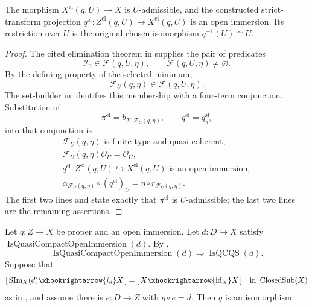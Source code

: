 \begin{lemma}
  \label{lemma:nagata-elimination-indeterminacy}
  \lean{}

  The morphism $X^{\mathrm{el}}(q,U)\to X$ is $U$-admissible, and the
  constructed strict-transform projection
  $q^{\mathrm{el}}\colon Z^{\mathrm{el}}(q,U)\to X^{\mathrm{el}}(q,U)$ is
  an open immersion.  Its restriction over $U$ is the original chosen
  isomorphism $q^{-1}(U)\cong U$.
\end{lemma}

\begin{proof}
  The cited elimination theorem in
   supplies the pair of predicates
  \[
    \mathcal I_0\in\mathscr F(q,U,\eta),
    \qquad
    \mathscr F(q,U,\eta)\ne\varnothing.
  \]
  By the defining property of the selected minimum,
  \[
    \mathcal F_U(q,\eta)\in\mathscr F(q,U,\eta).
  \]
  The set-builder in  identifies
  this membership with a four-term conjunction.  Substitution of
  \[
    \pi^{\mathrm{el}}=b_{X,\mathcal F_U(q,\eta)},\qquad
    q^{\mathrm{el}}=q^{\mathrm{st}}_{\pi^{\mathrm{el}}}
  \]
  into that conjunction is
  \[
  \begin{gathered}
    \mathcal F_U(q,\eta)\text{ is finite-type and quasi-coherent},\\
    \mathcal F_U(q,\eta)\mathcal O_U=\mathcal O_U,\\
    q^{\mathrm{el}}\colon Z^{\mathrm{el}}(q,U)
       \hookrightarrow X^{\mathrm{el}}(q,U)
       \text{ is an open immersion},\\
    \alpha_{\mathcal F_U(q,\eta)}\circ(q^{\mathrm{el}})_U
      =\eta\circ r_{\mathcal F_U(q,\eta)}.
  \end{gathered}
  \]
  The first two lines and
   state exactly that
  $\pi^{\mathrm{el}}$ is $U$-admissible; the last two lines are the remaining
  assertions.
\end{proof}

\begin{lemma}
  \label{lemma:nagata-proper-open-dense-iso}
  \lean{}

  Let $q\colon Z\to X$ be proper and an open immersion.  Let
  $d\colon D\hookrightarrow X$ satisfy
  $\operatorname{IsQuasiCompactOpenImmersion}(d)$.  By
  ,
  \[
    \operatorname{IsQuasiCompactOpenImmersion}(d)
      \Longrightarrow\operatorname{IsQCQS}(d).                   \tag{PDO0}
  \]
  Suppose that
  \[
    [\,\operatorname{SIm}_X(d)\xhookrightarrow{i_d}X\,]
      =[\,X\xhookrightarrow{\operatorname{id}_X}X\,]
      \quad\text{in }\operatorname{ClosedSub}(X)
  \]
  as in , and assume there is
  $e\colon D\to Z$ with $q\circ e=d$.  Then $q$ is an isomorphism.
\end{lemma}

